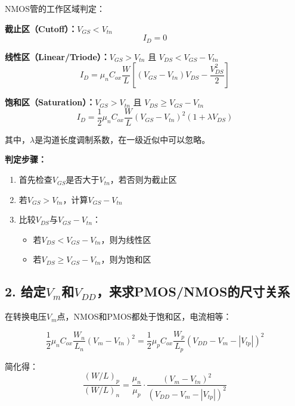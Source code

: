 \documentclass[UTF8,12pt,a4paper]{ctexart}
\begin{document}
NMOS管的工作区域判定：

\textbf{截止区（Cutoff）：}$V_{GS} < V_{tn}$
\begin{equation}
I_D = 0
\end{equation}

\textbf{线性区（Linear/Triode）：}$V_{GS} > V_{tn}$ 且 $V_{DS} < V_{GS} - V_{tn}$
\begin{equation}
I_D = \mu_n C_{ox} \frac{W}{L} \left[(V_{GS} - V_{tn})V_{DS} - \frac{V_{DS}^2}{2}\right]
\end{equation}

\textbf{饱和区（Saturation）：}$V_{GS} > V_{tn}$ 且 $V_{DS} \geq V_{GS} - V_{tn}$
\begin{equation}
I_D = \frac{1}{2} \mu_n C_{ox} \frac{W}{L} (V_{GS} - V_{tn})^2 (1 + \lambda V_{DS})
\end{equation}

其中，$\lambda$是沟道长度调制系数，在一级近似中可以忽略。

\textbf{判定步骤：}
\begin{enumerate}
    \item 首先检查$V_{GS}$是否大于$V_{tn}$，若否则为截止区
    \item 若$V_{GS} > V_{tn}$，计算$V_{GS} - V_{tn}$
    \item 比较$V_{DS}$与$V_{GS} - V_{tn}$：
    \begin{itemize}
        \item 若$V_{DS} < V_{GS} - V_{tn}$，则为线性区
        \item 若$V_{DS} \geq V_{GS} - V_{tn}$，则为饱和区
    \end{itemize}
\end{enumerate}

\subsection*{2. 给定$V_m$和$V_{DD}$，来求PMOS/NMOS的尺寸关系}

在转换电压$V_m$点，NMOS和PMOS都处于饱和区，电流相等：

\begin{equation}
\frac{1}{2} \mu_n C_{ox} \frac{W_n}{L_n} (V_m - V_{tn})^2 = \frac{1}{2} \mu_p C_{ox} \frac{W_p}{L_p} (V_{DD} - V_m - |V_{tp}|)^2
\end{equation}

简化得：
\begin{equation}
\frac{(W/L)_p}{(W/L)_n} = \frac{\mu_n}{\mu_p} \cdot \frac{(V_m - V_{tn})^2}{(V_{DD} - V_m - |V_{tp}|)^2}
\end{equation}
\end{document}

